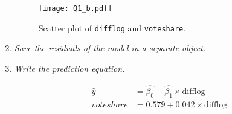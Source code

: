 \documentclass[12pt,letterpaper]{article}
\begin{document}
\begin{enumerate}
					
		\begin{figure}[b!]\centering
			\caption{\footnotesize Scatter plot of \texttt{difflog} and \texttt{voteshare}.}\vspace{-1cm}
			\label{fig:Q1_b}
			\texttt{[image: Q1\_b.pdf]}\\
		\end{figure}
	
\newpage
		\item \emph{Save the residuals of the model in a separate object.}	\vspace{.25cm}
							
							\vspace{.25cm}
		\item \emph{Write the prediction equation.}\vspace{.25cm}
		
		\begin{align*}
		\hat{y} &= \hat{\beta_0} + \hat{\beta_1} \times  \text{difflog}\\
		voteshare &= 0.579 + 0.042 \times \text{difflog}
		\end{align*}
	\end{enumerate}
	
\end{document}
